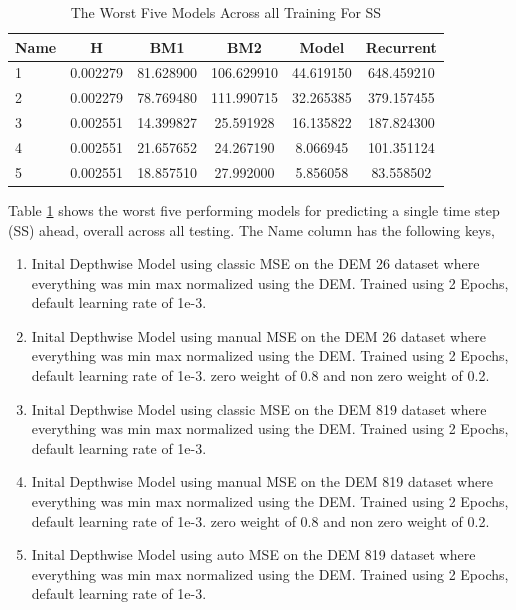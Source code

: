 \begin{table}[htbp]
	\centering
	\caption{The Worst Five Models Across all Training For SS}
	\label{tab:worstss}
	\begin{tabular}{p{2cm}ccccc}
		\toprule
		Name &  H &  BM1 &  BM2 &  Model &  Recurrent \\
		\midrule
		1 &       0.002279 &       81.628900 &      106.629910 &  44.619150 &          648.459210 \\
		2 &       0.002279 &       78.769480 &      111.990715 &  32.265385 &          379.157455 \\
		3 &       0.002551 &       14.399827 &       25.591928 &  16.135822 &          187.824300 \\
		4 &       0.002551 &       21.657652 &       24.267190 &   8.066945 &          101.351124 \\
		5 &       0.002551 &       18.857510 &       27.992000 &   5.856058 &           83.558502 \\
		\bottomrule
	\end{tabular}

\end{table}
Table \ref{tab:worstss} shows the worst five performing models for predicting a single time step (SS) ahead, overall across all testing. The Name column has the following keys,
\begin{enumerate}
	\item Inital Depthwise Model using classic MSE on the DEM 26 dataset where everything was min max normalized using the DEM. Trained using 2 Epochs, default learning rate of 1e-3.
	\item Inital Depthwise Model using manual MSE on the DEM 26 dataset where everything was min max normalized using the DEM. Trained using 2 Epochs, default learning rate of 1e-3. zero weight of 0.8 and non zero weight of 0.2.
	\item Inital Depthwise Model using classic MSE on the DEM 819 dataset where everything was min max normalized using the DEM. Trained using 2 Epochs, default learning rate of 1e-3.
	\item Inital Depthwise Model using  manual MSE on the DEM 819 dataset where everything was min max normalized using the DEM. Trained using 2 Epochs, default learning rate of 1e-3. zero weight of 0.8 and non zero weight of 0.2.
	\item Inital Depthwise Model using  auto MSE on the DEM 819 dataset where everything was min max normalized using the DEM. Trained using 2 Epochs, default learning rate of 1e-3.
\end{enumerate}



